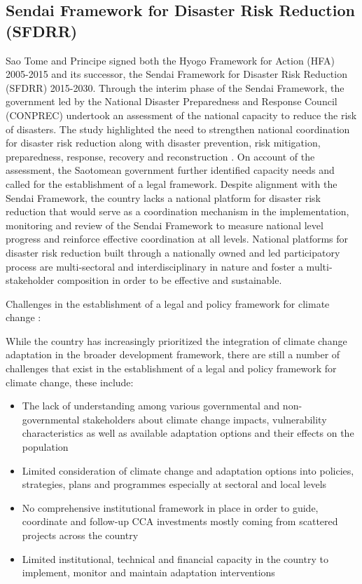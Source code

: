 \documentclass[
]{book}
\providecommand{\tightlist}{%
  \setlength{\itemsep}{0pt}\setlength{\parskip}{0pt}}
\begin{document}
\hypertarget{sendai-framework-for-disaster-risk-reduction-sfdrr}{%
\subsection{Sendai Framework for Disaster Risk Reduction (SFDRR)}\label{sendai-framework-for-disaster-risk-reduction-sfdrr}}

Sao Tome and Principe signed both the Hyogo Framework for Action (HFA) 2005-2015 and its successor, the Sendai Framework for Disaster Risk Reduction (SFDRR) 2015-2030. Through the interim phase of the Sendai Framework, the government led by the National Disaster Preparedness and Response Council (CONPREC) undertook an assessment of the national capacity to reduce the risk of disasters. The study highlighted the need to strengthen national coordination for disaster risk reduction along with disaster prevention, risk mitigation, preparedness, response, recovery and reconstruction . On account of the assessment, the Saotomean government further identified capacity needs and called for the establishment of a legal framework. Despite alignment with the Sendai Framework, the country lacks a national platform for disaster risk reduction that would serve as a coordination mechanism in the implementation, monitoring and review of the Sendai Framework to measure national level progress and reinforce effective coordination at all levels. National platforms for disaster risk reduction built through a nationally owned and led participatory process are multi-sectoral and interdisciplinary in nature and foster a multi-stakeholder composition in order to be effective and sustainable.

Challenges in the establishment of a legal and policy framework for climate change :

While the country has increasingly prioritized the integration of climate change adaptation in the broader development framework, there are still a number of challenges that exist in the establishment of a legal and policy framework for climate change, these include:

\begin{itemize}
\tightlist
\item
  The lack of understanding among various governmental and non-governmental stakeholders about climate change impacts, vulnerability characteristics as well as available adaptation options and their effects on the population
\item
  Limited consideration of climate change and adaptation options into policies, strategies, plans and programmes especially at sectoral and local levels
\item
  No comprehensive institutional framework in place in order to guide, coordinate and follow-up CCA investments mostly coming from scattered projects across the country
\item
  Limited institutional, technical and financial capacity in the country to implement, monitor and maintain adaptation interventions
\end{itemize}
\end{document}
